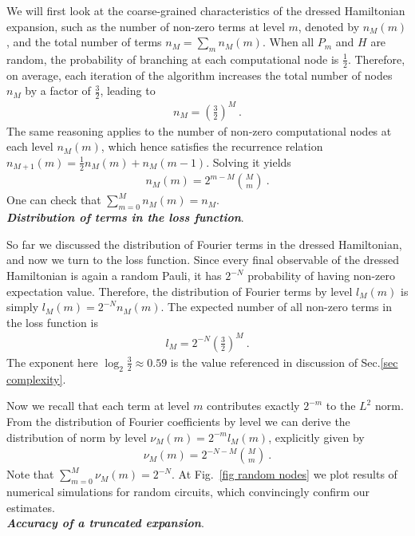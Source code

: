 \documentclass[twocolumn, amsfonts, amssymb, aps, nofootinbib]{revtex4-2}
\begin{document}
We will first look at the coarse-grained characteristics of the dressed Hamiltonian expansion, such as the number of non-zero terms at level $m$, denoted by $n_M(m)$, and the total number of terms $n_M=\sum_m n_M(m)$. When all $P_m$ and $H$ are random, the probability of branching at each computational node is $\frac12$. Therefore, on average, each iteration of the algorithm increases the total number of nodes $n_M$ by a factor of $\frac32$, leading to
\begin{align}
	n_M=\left(\frac32\right)^M \ . \label{nM}
\end{align}
The same reasoning applies to the number of non-zero computational nodes at each level $n_{M}(m)$, which hence satisfies the recurrence relation $n_{M+1}(m)=\frac12 n_{M}(m)+n_{M}(m-1)$. Solving it yields
\begin{align}
	n_{M}(m)=2^{m-M}\binom{M}{m} \ .
\end{align}
One can check that $\sum_{m=0}^M n_{M}(m)=n_M$.
\\[4pt]
\textbf{\textit{Distribution of terms in the loss function}}.
 
So far we discussed the distribution of Fourier terms in the dressed Hamiltonian, and now we turn to the loss function. Since every final observable of the dressed Hamiltonian is again a random Pauli, it has $2^{-N}$ probability of having non-zero expectation value. Therefore, the distribution of Fourier terms by level $l_M(m)$ is simply $l_M(m)=2^{-N}n_M(m)$. The expected number of all non-zero terms in the loss function is
\begin{align}
	l_M = 2^{-N}\left(\frac32\right)^{M} \ . \label{lM}
\end{align}
The exponent here $\log_2\frac32\approx 0.59$ is the value referenced in discussion of Sec.\ref{sec complexity}.

Now we recall that each term at level $m$ contributes exactly $2^{-m}$ to the $L^2$ norm. From the distribution of Fourier coefficients by level we can derive the distribution of norm by level $\nu_{M}(m)=2^{-m}l_{M}(m)$, explicitly given by
\begin{align}
	\nu_{M}(m)=2^{-N-M}\binom{M}{m} \ . \label{binom}
\end{align}
Note that $\sum_{m=0}^M \nu_{M}(m)=2^{-N}$. At Fig.~\ref{fig random nodes} we plot results of numerical simulations for random circuits, which convincingly confirm our estimates. 
\\[4pt]
\textbf{\textit{Accuracy of a truncated expansion}}. 
\end{document}
